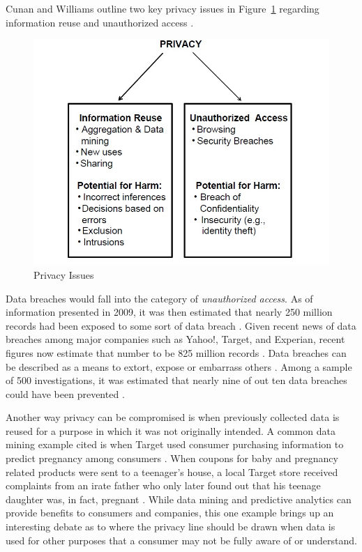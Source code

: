\documentclass[sigconf]{acmart}
\begin{document}
Cunan and Williams outline two key privacy issues in Figure~\ref{f:PrivacyIssues} regarding information reuse and unauthorized access \cite{Culnan2009}. 

\begin{figure}[!htb]
  \centering\includegraphics[width=\columnwidth]{images/privacy.jpg}
  \caption{Privacy Issues}\label{f:PrivacyIssues}
\end{figure}

Data breaches would fall into the category of \textit{unauthorized access}. As of information presented in 2009, it was then estimated that nearly 250 million records had been exposed to some sort of data breach \cite{Cavoukian2012}. Given recent news of data breaches among major companies such as Yahoo!, Target, and Experian, recent figures now estimate that number to be 825 million records \cite{Shell2017}. Data breaches can be described as a means to extort, expose or embarrass others \cite{Agelidis2016}. Among a sample of 500 investigations, it was estimated that nearly nine of out ten data breaches could have been prevented \cite{Culnan2009}. 

Another way privacy can be compromised is when previously collected data is reused for a purpose in which it was not originally intended. A common data mining example cited is when Target used consumer purchasing information to predict pregnancy among consumers \cite{Xu2014}. When coupons for baby and pregnancy related products were sent to a teenager's house, a local Target store received complaints from an irate father who only later found out that his teenage daughter was, in fact, pregnant \cite{Xu2014}. While data mining and predictive analytics can provide benefits to consumers and companies, this one example brings up an interesting debate as to where the privacy line should be drawn when data is used for other purposes that a consumer may not be fully aware of or understand.
\end{document}
